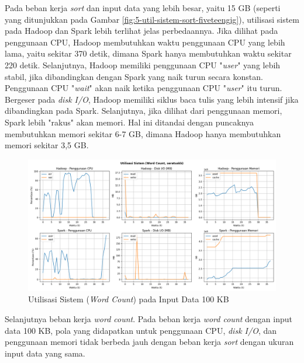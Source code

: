 Pada beban kerja \textit{sort} dan input data yang lebih besar, yaitu 15 GB (seperti yang ditunjukkan pada Gambar \ref{fig:5-util-sistem-sort-fiveteengig}), utilisasi sistem pada Hadoop dan Spark lebih terlihat jelas perbedaannya. Jika dilihat pada penggunaan CPU, Hadoop membutuhkan waktu penggunaan CPU yang lebih lama, yaitu sekitar 370 detik, dimana Spark hanya membutuhkan waktu sekitar 220 detik. Selanjutnya, Hadoop memiliki penggunaan CPU "\textit{user}" yang lebih stabil, jika dibandingkan dengan Spark yang naik turun secara konstan. Penggunaan CPU "\textit{wait}" akan naik ketika penggunaan CPU "\textit{user}" itu turun. Bergeser pada \textit{disk I/O}, Hadoop memiliki siklus baca tulis yang lebih intensif jika dibandingkan pada Spark. Selanjutnya, jika dilihat dari penggunaan memori, Spark lebih "rakus" akan memori. Hal ini ditandai dengan puncaknya membutuhkan memori sekitar 6-7 GB, dimana Hadoop hanya membutuhkan memori sekitar 3,5 GB.

\begin{figure}[h]
    \centering
    \includegraphics[width=1\textwidth]{figures/ch04/5-util-sistem-wordcount-seratuskb}
    \caption{Utilisasi Sistem (\textit{Word Count}) pada Input Data 100 KB}
    \label{fig:5-util-sistem-wordcount-seratuskb}
\end{figure}

Selanjutnya beban kerja \textit{word count}. Pada beban kerja \textit{word count} dengan input data 100 KB, pola yang didapatkan untuk penggunaan CPU, \textit{disk I/O}, dan penggunaan memori tidak berbeda jauh dengan beban kerja \textit{sort} dengan ukuran input data yang sama. 

